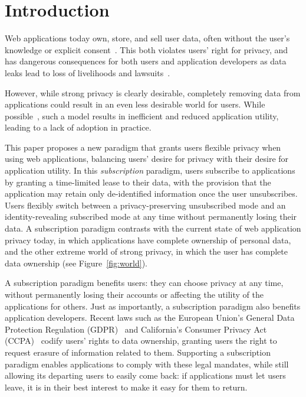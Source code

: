 \section{Introduction}

Web applications today own, store, and sell user data, often without the user's knowledge or
explicit consent~\cite{nytimes:fb, npr:data}. This both violates users' right for privacy, and has
dangerous consequences for both users and application developers as data leaks lead to loss of
livelihoods and lawsuits~\cite{breach:amazon,breach:twitter, breach:fb, breach:marriott,
breach:quora}. 

However, while strong privacy is clearly desirable, completely removing data from applications
could result in an even less desirable world for users. While possible~\cite{amber, w5,
blockstack, bstore}, such a model results in inefficient and reduced application utility, leading to
a lack of adoption in practice.  

This paper proposes a new paradigm that grants users flexible privacy when using web applications,
balancing users' desire for privacy with their desire for application utility. In this
\emph{subscription} paradigm, users subscribe to applications by granting a time-limited lease to
their data, with the provision that the application may retain only de-identified information once
the user unsubscribes. Users flexibly switch between a privacy-preserving unsubscribed mode and an
identity-revealing subscribed mode at any time without permanently losing their data. A
subscription paradigm contrasts with the current state of web application privacy today, in which
applications have complete ownership of personal data, and the other extreme world of strong
privacy, in which the user has complete data ownership (see Figure~\ref{fig:world}). 

A subscription paradigm benefits users: they can choose privacy at any time, without
permanently losing their accounts or affecting the utility of the applications for others.  Just as
importantly, a subscription paradigm  also benefits application developers. Recent laws such as the
European Union's General Data Protection Regulation (GDPR)~\cite{eu:gdpr} and California's Consumer
Privacy Act (CCPA)~\cite{ca:privacy-act} codify users' rights to data ownership, granting users the
right to request erasure of information related to them. Supporting a subscription paradigm enables
applications to comply with these legal mandates, while still allowing its departing users to easily
come back: if applications must let users leave, it is in their best interest to make it easy for
them to return.  

